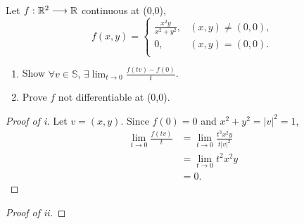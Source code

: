 \documentclass[../hw4]{subfiles}
\begin{document}
\begin{problem}[2]
Let $f:\mathbb{R}^2\longrightarrow\mathbb{R}$ continuous at (0,0), \[
	f(x,y) = \begin{cases}
		\frac{x^2 y}{x^2 + y^2}, & (x,y)\neq (0,0), \\
		0,                       & (x,y)= (0,0).    \\
	\end{cases}
\]
\begin{enumerate}[label=\roman*)]
	\item Show $\forall v \in \mathbb{S},\, \exists \lim_{t \to 0} \frac{f(tv)-f(0)}{t}$.
	\item Prove $f$ not differentiable at (0,0).
\end{enumerate}
\end{problem}
\begin{proof}[Proof of i]
	Let $v=(x,y)$. Since $f(0)=0$ and $x^2 + y^2={|v|}^2=1$, \begin{align*}
		\lim_{t \to 0} \frac{f(tv)}{t} & = \lim_{t \to 0} \frac{t^3x^2y}{t{|v|}^2} \\
		                               & =  \lim_{t \to 0} t^2x^2y                 \\
		                               & = 0
		.\end{align*}
\end{proof}
\begin{proof}[Proof of ii]

\end{proof}
\end{document}
